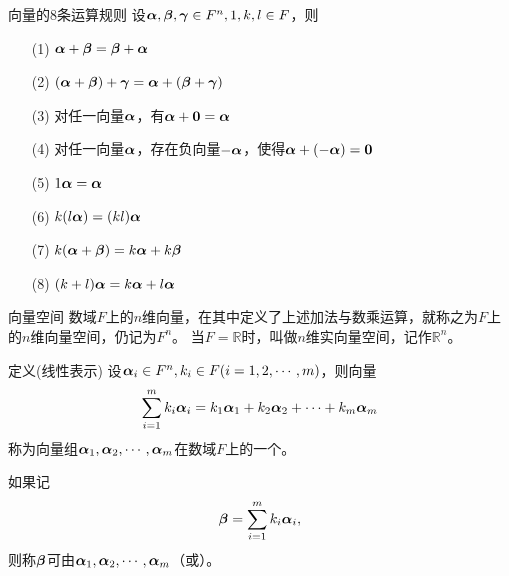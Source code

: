 \begin{frame}
  \begin{footnotesize}
    \begin{block}{向量的8条运算规则}
      设$\boldsymbol{\alpha},\boldsymbol{\beta},\boldsymbol{\gamma}\in F^n, 1,k,l\in F$，则
      \begin{itemize}
      \item[(1)] $\boldsymbol{\alpha}+\boldsymbol{\beta}=\boldsymbol{\beta}+\boldsymbol{\alpha}$\\[0.1in]
      \item[(2)] $(\boldsymbol{\alpha}+\boldsymbol{\beta})+\boldsymbol{\gamma}=\boldsymbol{\alpha}+(\boldsymbol{\beta}+\boldsymbol{\gamma})$\\[0.1in]
      \item[(3)] 对任一向量$\boldsymbol{\alpha}$，有$\boldsymbol{\alpha}+\mathbf{0}=\boldsymbol{\alpha}$\\[0.1in]
      \item[(4)] 对任一向量$\boldsymbol{\alpha}$，存在负向量$-\boldsymbol{\alpha}$，使得$\boldsymbol{\alpha}+(-\boldsymbol{\alpha})=\mathbf{0}$\\[0.1in]
      \item[(5)] $1\boldsymbol{\alpha}=\boldsymbol{\alpha}$
      \item[(6)] $k(l\boldsymbol{\alpha})=(kl)\boldsymbol{\alpha}$
      \item[(7)] $k(\boldsymbol{\alpha}+\boldsymbol{\beta})=k\boldsymbol{\alpha}+k\boldsymbol{\beta}$
      \item[(8)] $(k+l)\boldsymbol{\alpha}=k\boldsymbol{\alpha}+l\boldsymbol{\alpha}$
      \end{itemize}
    \end{block}
    \pause
    \begin{block}{向量空间}
      数域$F$上的$n$维向量，在其中定义了上述加法与数乘运算，就称之为$F$上的$n$维向量空间，仍记为$F^n$。
      当$F=\mathbb R$时，叫做$n$维实向量空间，记作$\mathbb R^n$。
    \end{block}

  \end{footnotesize}
\end{frame}

\begin{frame}
  \begin{footnotesize}
    \begin{block}{定义(线性表示)}
      设$\boldsymbol{\alpha}_i\in F^n, k_i \in F (i=1,2,\cdots,m)$，则向量
      $$
      \sum_{i=1}^m k_i\boldsymbol{\alpha}_i = k_1\boldsymbol{\alpha}_1 + k_2\boldsymbol{\alpha}_2+\cdots + k_m\boldsymbol{\alpha}_m
      $$
      称为向量组$\boldsymbol{\alpha}_1,\boldsymbol{\alpha}_2,\cdots,\boldsymbol{\alpha}_m$在数域$F$上的一个。
      \vspace{0.1in}

      如果记
      $$\boldsymbol{\beta}=\sum_{i=1}^m k_i\boldsymbol{\alpha}_i,$$
      则称$\boldsymbol{\beta}$可由$\boldsymbol{\alpha}_1,\boldsymbol{\alpha}_2,\cdots,\boldsymbol{\alpha}_m$（或）。
    \end{block}
  \end{footnotesize}
\end{frame}

